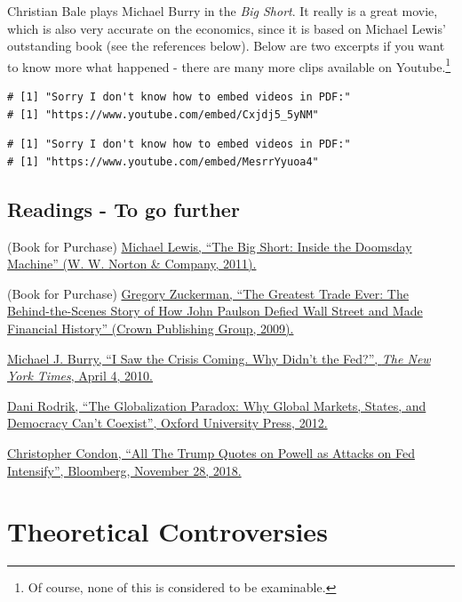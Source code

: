 \documentclass[]{book}
\let\rmarkdownfootnote\footnote%
\def\footnote{\protect\rmarkdownfootnote}
\begin{document}
Christian Bale plays Michael Burry in the \emph{Big Short}. It really is
a great movie, which is also very accurate on the economics, since it is
based on Michael Lewis' outstanding book (see the references below).
Below are two excerpts if you want to know more what happened - there
are many more clips available on Youtube.\footnote{Of course, none of
  this is considered to be examinable.}

\begin{verbatim}
# [1] "Sorry I don't know how to embed videos in PDF:"
# [1] "https://www.youtube.com/embed/Cxjdj5_5yNM"
\end{verbatim}

\begin{verbatim}
# [1] "Sorry I don't know how to embed videos in PDF:"
# [1] "https://www.youtube.com/embed/MesrrYyuoa4"
\end{verbatim}

\section*{Readings - To go further}\label{readings---to-go-further-11}

(Book for Purchase)
\href{https://www.amazon.com/Big-Short-Inside-Doomsday-Machine/dp/0393338827}{Michael
Lewis, ``The Big Short: Inside the Doomsday Machine'' (W. W. Norton \&
Company, 2011).}

(Book for Purchase)
\href{https://www.amazon.com/Greatest-Trade-Ever-Behind-Scenes-ebook/dp/B002UBRFFU}{Gregory
Zuckerman, ``The Greatest Trade Ever: The Behind-the-Scenes Story of How
John Paulson Defied Wall Street and Made Financial History'' (Crown
Publishing Group, 2009).}

\href{https://search.proquest.com/docview/434348749/fulltext}{Michael J.
Burry, ``I Saw the Crisis Coming. Why Didn't the Fed?'', \emph{The New
York Times}, April 4, 2010.}

\href{https://global.oup.com/academic/product/the-globalization-paradox-9780199652525?lang=en\&cc=il}{Dani
Rodrik, ``The Globalization Paradox: Why Global Markets, States, and
Democracy Can't Coexist'', Oxford University Press, 2012.}

\href{https://www.bloomberg.com/news/articles/2018-11-28/all-the-trump-quotes-on-powell-as-attacks-on-fed-intensify}{Christopher
Condon, ``All The Trump Quotes on Powell as Attacks on Fed Intensify'',
Bloomberg, November 28, 2018.}

\chapter{Theoretical Controversies}\label{theoretical-controversies}
\end{document}
